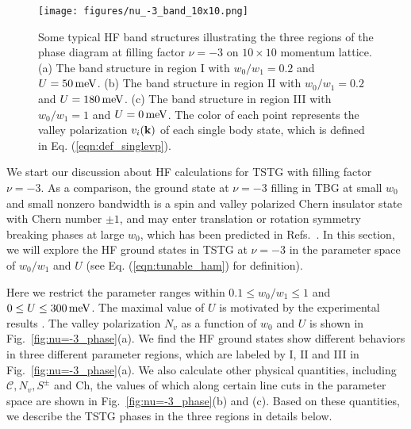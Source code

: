 \documentclass[prb,aps,nofootinbib,amssymb,twocolumn,superscriptaddress,10pt]{revtex4-2}
\begin{document}
\begin{figure*}[t]
	\centering
	\texttt{[image: figures/nu\_-3\_band\_10x10.png]}
	\caption{Some typical HF band structures illustrating the three regions of the phase diagram at filling factor $\nu=-3$ on $10\times 10$ momentum lattice. (a) The band structure in region I with $w_0/w_1 = 0.2$ and $U=50\rm\,meV$. (b) The band structure in region II with $w_0/w_1 = 0.2$ and $U = 180\rm\,meV$. (c) The band structure in region III with $w_0/w_1 = 1$ and $U = 0\,\rm meV$. The color of each point represents the valley polarization $v_i(\mathbf{k})$ of each single body state, which is defined in Eq. (\ref{eqn:def_singlevp}).}
	\label{fig:nu=-3_band}
\end{figure*}

We start our discussion about HF calculations for TSTG with filling factor $\nu=-3$. As a comparison, the ground state at $\nu=-3$ filling in TBG at small $w_0$ and small nonzero bandwidth is a spin and valley polarized Chern insulator state with Chern number $\pm1$, and may enter translation or rotation symmetry breaking phases at large $w_0$, which has been predicted in Refs.~\cite{ZHA20,BUL20,LIA20,XIE20a}. In this section, we will explore the HF ground states in TSTG at $\nu=-3$ in the parameter space of $w_0/w_1$ and $U$ (see Eq. (\ref{eqn:tunable_ham}) for definition).

Here we restrict the parameter ranges within $0.1\leq w_0/w_1 \leq 1$ and $0 \leq U \leq 300\,\rm meV$. The maximal value of $U$ is motivated by the experimental results \cite{PAR20}.
The valley polarization $N_v$ as a function of $w_0$ and $U$ is shown in Fig.~\ref{fig:nu=-3_phase}(a). We find the HF ground states show different behaviors in three different parameter regions, which are labeled by I, II and III in Fig.~\ref{fig:nu=-3_phase}(a). We also calculate other physical quantities, including $\mathcal{C}, N_v, S^\pm$ and $\mathrm{Ch}$, the values of which along certain line cuts in the parameter space are shown in Fig.~\ref{fig:nu=-3_phase}(b) and (c). Based on these quantities, we describe the TSTG phases in the three regions in details below.
\end{document}
